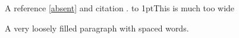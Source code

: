 \documentclass{article}
\begin{document}

A reference \ref{absent} and citation \cite{missing}.
\hbox to 1pt{This is much too wide}
\parbox{1cm}{A very loosely filled paragraph with spaced words.}
\PackageError{demo}{A package error}{A deliberate fixture error.}
\end{document}
